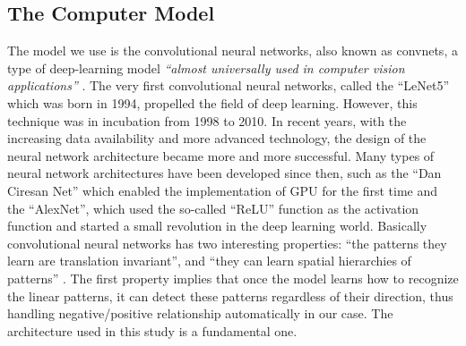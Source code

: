 \documentclass[12pt]{article}
\begin{document}
\subsection{The Computer Model}\label{the-computer-model}

The model we use is the convolutional neural networks, also known as
convnets, a type of deep-learning model \emph{``almost universally used
in computer vision applications''} \citep{DLR18}. The very first
convolutional neural networks, called the ``LeNet5'' which was born in
1994, propelled the field of deep learning. However, this technique was
in incubation from 1998 to 2010. In recent years, with the increasing
data availability and more advanced technology, the design of the neural
network architecture became more and more successful. Many types of
neural network architectures have been developed since then, such as the
``Dan Ciresan Net'' which enabled the implementation of GPU for the
first time and the ``AlexNet'', which used the so-called ``ReLU''
function as the activation function and started a small revolution in
the deep learning world. \citep{cnn2017} Basically convolutional neural
networks has two interesting properties: ``the patterns they learn are
translation invariant'', and ``they can learn spatial hierarchies of
patterns'' \citep{DLR18}. The first property implies that once the model
learns how to recognize the linear patterns, it can detect these
patterns regardless of their direction, thus handling negative/positive
relationship automatically in our case. The architecture used in this
study is a fundamental one.
\end{document}
